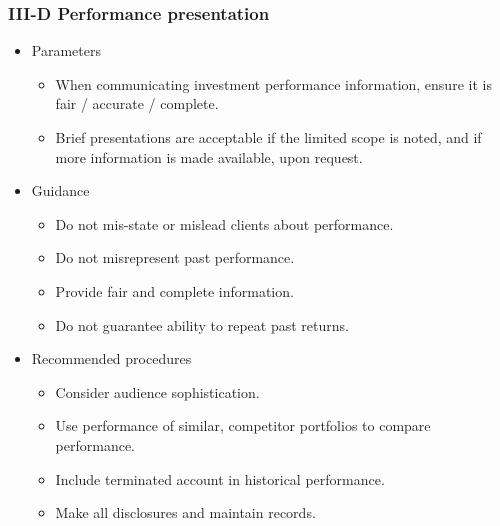 \documentclass[../notes_compiled.tex]{subfiles}
\begin{document}
\subsubsection{III-D Performance presentation}
\begin{itemize}
\item Parameters
\begin{itemize}
\item When communicating investment performance information, ensure it is fair / accurate / complete.
\item Brief presentations are acceptable if the limited scope is noted, and if more information is made available, upon request.
\end{itemize}
\item Guidance
\begin{itemize}
\item Do not mis-state or mislead clients about performance.
\item Do not misrepresent past performance.
\item Provide fair and complete information.
\item Do not guarantee ability to repeat past returns.
\end{itemize}
\item Recommended procedures
\begin{itemize}
\item Consider audience sophistication.
\item Use performance of similar, competitor portfolios to compare performance.
\item Include terminated account in historical performance.
\item Make all disclosures and maintain records.
\end{itemize}
\end{itemize}
\end{document}
